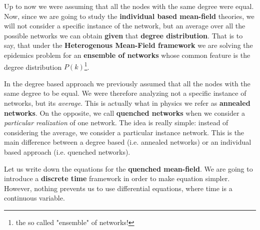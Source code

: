 \documentclass[../main/main.tex]{subfiles}
\begin{document}
Up to now we were assuming that all the nodes with the same degree were equal. Now, since we are going to study the \textbf{individual based mean-field} theories, we will not consider a specific instance of the network, but an average over all the possible networks we can obtain \textbf{given} that \textbf{degree distribution}.
That is to say, that under the \textbf{Heterogenous Mean-Field framework} we are solving the epidemics problem for an \textbf{ensemble of networks} whose common feature is the degree distribution \( P(k) \)\footnote{the so called "ensemble" of networks!}.

In the degree based approach we previously assumed that all the nodes with the same degree to be equal. We were therefore analyzing not a specific instance of networks, but its \textit{average}. This is actually what in physics we refer as \textbf{annealed networks}.
On the opposite, we call \textbf{quenched networks} when we consider a \textit{particular realization} of one network. The idea is really simple: instead of considering the average, we consider a particular instance network. This is the main difference between a degree based (i.e. annealed networks) or an individual based approach (i.e. quenched networks).

Let us write down the equations for the \textbf{quenched mean-field}. We are going to introduce a \textbf{discrete time} framework in order to make equation simpler. However, nothing prevents us to use differential equations, where time is a continuous variable.
\end{document}
